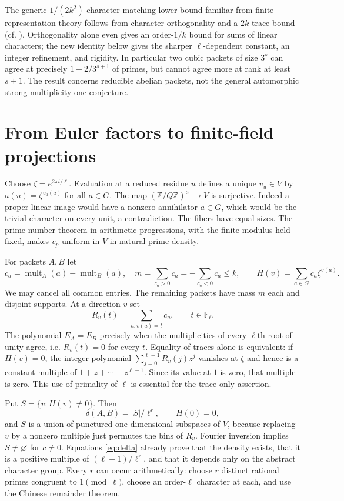 \documentclass[11pt]{article}
\theoremstyle{remark}\newtheorem{remark}[theorem]{Remark}
\newcommand{\F}{\mathbb F}
\newcommand{\Z}{\mathbb Z}
\begin{document}
The generic $1/(2k^2)$ character-matching lower bound familiar from finite representation theory follows from character orthogonality and a $2k$ trace bound (cf. \cite{martinwalji,walji}). Orthogonality alone even gives an order-$1/k$ bound for sums of linear characters; the new identity below gives the sharper $\ell$-dependent constant, an integer refinement, and rigidity. In particular two cubic packets of size $3^s$ can agree at precisely $1-2/3^{s+1}$ of primes, but cannot agree more at rank at least $s+1$. The result concerns reducible abelian packets, not the general automorphic strong multiplicity-one conjecture.

\section{From Euler factors to finite-field projections}
Choose $\zeta=e^{2\pi i/\ell}$. Evaluation at a reduced residue $u$ defines a unique $v_u\in V$ by $a(u)=\zeta^{v_u(a)}$ for all $a\in G$. The map $(\Z/Q\Z)^\times\to V$ is surjective. Indeed a proper linear image would have a nonzero annihilator $a\in G$, which would be the trivial character on every unit, a contradiction. The fibers have equal sizes. The prime number theorem in arithmetic progressions, with the finite modulus held fixed, makes $v_p$ uniform in $V$ in natural prime density.

For packets $A,B$ let
\[
 c_a=\operatorname{mult}_A(a)-\operatorname{mult}_B(a),\quad
 m=\sum_{c_a>0}c_a=-\sum_{c_a<0}c_a\le k,\qquad
 H(v)=\sum_{a\in G}c_a\zeta^{v(a)}.
\]
We may cancel all common entries. The remaining packets have mass $m$ each and disjoint supports. At a direction $v$ set
\[ R_v(t)=\sum_{a:v(a)=t}c_a,\qquad t\in\F_\ell.\]
The polynomial $E_A=E_B$ precisely when the multiplicities of every $\ell$th root of unity agree, i.e. $R_v(t)=0$ for every $t$. Equality of traces alone is equivalent: if $H(v)=0$, the integer polynomial $\sum_{j=0}^{\ell-1}R_v(j)z^j$ vanishes at $\zeta$ and hence is a constant multiple of $1+z+\cdots+z^{\ell-1}$. Since its value at $1$ is zero, that multiple is zero. This use of primality of $\ell$ is essential for the trace-only assertion.

Put $S=\{v:H(v)\ne0\}$. Then
\begin{equation}\label{eq:delta}
 \delta(A,B)=|S|/\ell^r,\qquad H(0)=0,
\end{equation}
and $S$ is a union of punctured one-dimensional subspaces of $V$, because replacing $v$ by a nonzero multiple just permutes the bins of $R_v$. Fourier inversion implies $S\ne\varnothing$ for $c\ne0$. Equations \eqref{eq:delta} already prove that the density exists, that it is a positive multiple of $(\ell-1)/\ell^r$, and that it depends only on the abstract character group. Every $r$ can occur arithmetically: choose $r$ distinct rational primes congruent to $1\pmod\ell$, choose an order-$\ell$ character at each, and use the Chinese remainder theorem.
\end{document}
